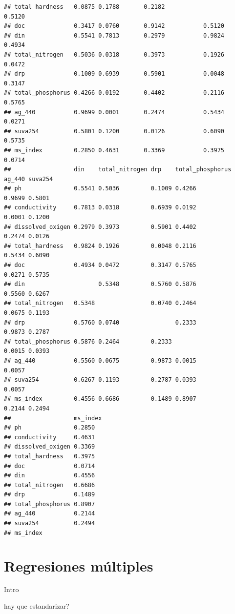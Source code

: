 \documentclass[
]{book}
\begin{document}
\begin{verbatim}
## total_hardness   0.0875 0.1788       0.2182                          0.5120
## doc              0.3417 0.0760       0.9142           0.5120               
## din              0.5541 0.7813       0.2979           0.9824         0.4934
## total_nitrogen   0.5036 0.0318       0.3973           0.1926         0.0472
## drp              0.1009 0.6939       0.5901           0.0048         0.3147
## total_phosphorus 0.4266 0.0192       0.4402           0.2116         0.5765
## ag_440           0.9699 0.0001       0.2474           0.5434         0.0271
## suva254          0.5801 0.1200       0.0126           0.6090         0.5735
## ms_index         0.2850 0.4631       0.3369           0.3975         0.0714
##                  din    total_nitrogen drp    total_phosphorus ag_440 suva254
## ph               0.5541 0.5036         0.1009 0.4266           0.9699 0.5801 
## conductivity     0.7813 0.0318         0.6939 0.0192           0.0001 0.1200 
## dissolved_oxigen 0.2979 0.3973         0.5901 0.4402           0.2474 0.0126 
## total_hardness   0.9824 0.1926         0.0048 0.2116           0.5434 0.6090 
## doc              0.4934 0.0472         0.3147 0.5765           0.0271 0.5735 
## din                     0.5348         0.5760 0.5876           0.5560 0.6267 
## total_nitrogen   0.5348                0.0740 0.2464           0.0675 0.1193 
## drp              0.5760 0.0740                0.2333           0.9873 0.2787 
## total_phosphorus 0.5876 0.2464         0.2333                  0.0015 0.0393 
## ag_440           0.5560 0.0675         0.9873 0.0015                  0.0057 
## suva254          0.6267 0.1193         0.2787 0.0393           0.0057        
## ms_index         0.4556 0.6686         0.1489 0.8907           0.2144 0.2494 
##                  ms_index
## ph               0.2850  
## conductivity     0.4631  
## dissolved_oxigen 0.3369  
## total_hardness   0.3975  
## doc              0.0714  
## din              0.4556  
## total_nitrogen   0.6686  
## drp              0.1489  
## total_phosphorus 0.8907  
## ag_440           0.2144  
## suva254          0.2494  
## ms_index
\end{verbatim}

\hypertarget{regresiones-muxfaltiples}{%
\section{Regresiones múltiples}\label{regresiones-muxfaltiples}}

Intro

hay que estandarizar?
\end{document}
